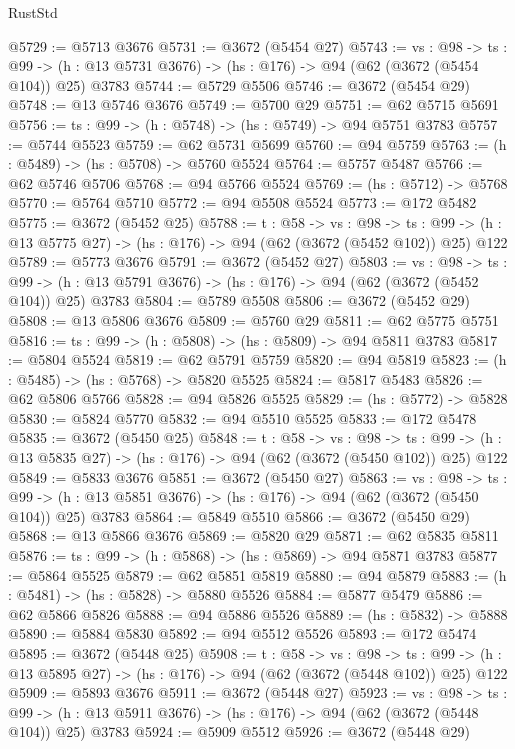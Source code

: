 \begin{lexlean}{RustStd}
\begin{coremodule}
@5729 := @5713 @3676
@5731 := @3672 (@5454 @27)
@5743 := {vs : @98} ->
  {ts : @99} -> (h : @13 @5731 @3676) -> (hs : @176) -> @94 (@62 (@3672 (@5454 @104)) @25) @3783
@5744 := @5729 @5506
@5746 := @3672 (@5454 @29)
@5748 := @13 @5746 @3676
@5749 := @5700 @29
@5751 := @62 @5715 @5691
@5756 := {ts : @99} -> (h : @5748) -> (hs : @5749) -> @94 @5751 @3783
@5757 := @5744 @5523
@5759 := @62 @5731 @5699
@5760 := @94 @5759
@5763 := (h : @5489) -> (hs : @5708) -> @5760 @5524
@5764 := @5757 @5487
@5766 := @62 @5746 @5706
@5768 := @94 @5766 @5524
@5769 := (hs : @5712) -> @5768
@5770 := @5764 @5710
@5772 := @94 @5508 @5524
@5773 := @172 @5482
@5775 := @3672 (@5452 @25)
@5788 := {t : @58} ->
  {vs : @98} ->
  {ts : @99} -> (h : @13 @5775 @27) -> (hs : @176) -> @94 (@62 (@3672 (@5452 @102)) @25) @122
@5789 := @5773 @3676
@5791 := @3672 (@5452 @27)
@5803 := {vs : @98} ->
  {ts : @99} -> (h : @13 @5791 @3676) -> (hs : @176) -> @94 (@62 (@3672 (@5452 @104)) @25) @3783
@5804 := @5789 @5508
@5806 := @3672 (@5452 @29)
@5808 := @13 @5806 @3676
@5809 := @5760 @29
@5811 := @62 @5775 @5751
@5816 := {ts : @99} -> (h : @5808) -> (hs : @5809) -> @94 @5811 @3783
@5817 := @5804 @5524
@5819 := @62 @5791 @5759
@5820 := @94 @5819
@5823 := (h : @5485) -> (hs : @5768) -> @5820 @5525
@5824 := @5817 @5483
@5826 := @62 @5806 @5766
@5828 := @94 @5826 @5525
@5829 := (hs : @5772) -> @5828
@5830 := @5824 @5770
@5832 := @94 @5510 @5525
@5833 := @172 @5478
@5835 := @3672 (@5450 @25)
@5848 := {t : @58} ->
  {vs : @98} ->
  {ts : @99} -> (h : @13 @5835 @27) -> (hs : @176) -> @94 (@62 (@3672 (@5450 @102)) @25) @122
@5849 := @5833 @3676
@5851 := @3672 (@5450 @27)
@5863 := {vs : @98} ->
  {ts : @99} -> (h : @13 @5851 @3676) -> (hs : @176) -> @94 (@62 (@3672 (@5450 @104)) @25) @3783
@5864 := @5849 @5510
@5866 := @3672 (@5450 @29)
@5868 := @13 @5866 @3676
@5869 := @5820 @29
@5871 := @62 @5835 @5811
@5876 := {ts : @99} -> (h : @5868) -> (hs : @5869) -> @94 @5871 @3783
@5877 := @5864 @5525
@5879 := @62 @5851 @5819
@5880 := @94 @5879
@5883 := (h : @5481) -> (hs : @5828) -> @5880 @5526
@5884 := @5877 @5479
@5886 := @62 @5866 @5826
@5888 := @94 @5886 @5526
@5889 := (hs : @5832) -> @5888
@5890 := @5884 @5830
@5892 := @94 @5512 @5526
@5893 := @172 @5474
@5895 := @3672 (@5448 @25)
@5908 := {t : @58} ->
  {vs : @98} ->
  {ts : @99} -> (h : @13 @5895 @27) -> (hs : @176) -> @94 (@62 (@3672 (@5448 @102)) @25) @122
@5909 := @5893 @3676
@5911 := @3672 (@5448 @27)
@5923 := {vs : @98} ->
  {ts : @99} -> (h : @13 @5911 @3676) -> (hs : @176) -> @94 (@62 (@3672 (@5448 @104)) @25) @3783
@5924 := @5909 @5512
@5926 := @3672 (@5448 @29)

\end{coremodule}
\end{lexlean}
